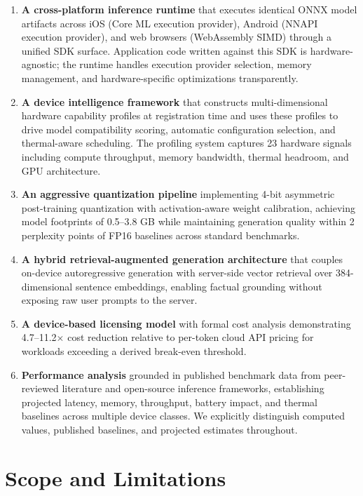 \documentclass[12pt, letterpaper, twoside]{report}
\begin{document}
\begin{enumerate}[leftmargin=*, itemsep=4pt]
\item \textbf{A cross-platform inference runtime} that executes identical ONNX model artifacts across iOS (Core ML execution provider), Android (NNAPI execution provider), and web browsers (WebAssembly SIMD) through a unified SDK surface. Application code written against this SDK is hardware-agnostic; the runtime handles execution provider selection, memory management, and hardware-specific optimizations transparently.

\item \textbf{A device intelligence framework} that constructs multi-dimensional hardware capability profiles at registration time and uses these profiles to drive model compatibility scoring, automatic configuration selection, and thermal-aware scheduling. The profiling system captures 23 hardware signals including compute throughput, memory bandwidth, thermal headroom, and GPU architecture.

\item \textbf{An aggressive quantization pipeline} implementing 4-bit asymmetric post-training quantization with activation-aware weight calibration, achieving model footprints of 0.5--3.8 GB while maintaining generation quality within 2 perplexity points of FP16 baselines across standard benchmarks.

\item \textbf{A hybrid retrieval-augmented generation architecture} that couples on-device autoregressive generation with server-side vector retrieval over 384-dimensional sentence embeddings, enabling factual grounding without exposing raw user prompts to the server.

\item \textbf{A device-based licensing model} with formal cost analysis demonstrating 4.7--11.2$\times$ cost reduction relative to per-token cloud API pricing for workloads exceeding a derived break-even threshold.

\item \textbf{Performance analysis} grounded in published benchmark data from peer-reviewed literature and open-source inference frameworks, establishing projected latency, memory, throughput, battery impact, and thermal baselines across multiple device classes. We explicitly distinguish computed values, published baselines, and projected estimates throughout.
\end{enumerate}

\section{Scope and Limitations}
\label{sec:scope}
\end{document}

